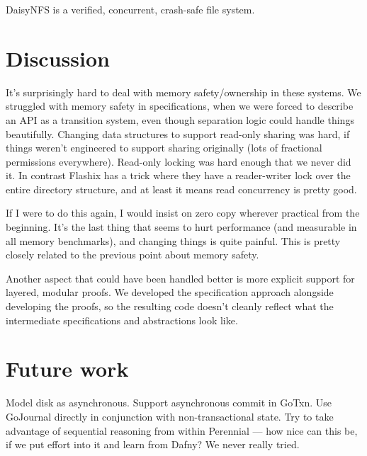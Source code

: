 DaisyNFS is a verified, concurrent, crash-safe file system.

\section{Discussion}

It's surprisingly hard to deal with memory safety/ownership in these systems. We
struggled with memory safety in specifications, when we were forced to describe
an API as a transition system, even though separation logic could handle things
beautifully. Changing data structures to support read-only sharing was hard, if
things weren't engineered to support sharing originally (lots of fractional
permissions everywhere). Read-only locking was hard enough that we never did it.
In contrast Flashix has a trick where they have a reader-writer lock over the
entire directory structure, and at least it means read concurrency is pretty
good.

If I were to do this again, I would insist on zero copy wherever practical from
the beginning. It's the last thing that seems to hurt performance (and
measurable in all memory benchmarks), and changing things is quite painful. This
is pretty closely related to the previous point about memory safety.

Another aspect that could have been handled better is more explicit support for
layered, modular proofs. We developed the specification approach alongside
developing the proofs, so the resulting code doesn't cleanly reflect what the
intermediate specifications and abstractions look like.

\resume

\section{Future work}

Model disk as asynchronous. Support asynchronous commit in GoTxn.  Use GoJournal
directly in conjunction with non-transactional state. Try to take advantage of
sequential reasoning from within Perennial --- how nice can this be, if we put
effort into it and learn from Dafny? We never really tried.
